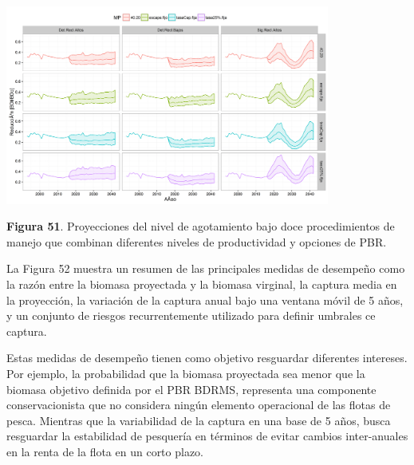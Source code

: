 \documentclass[
  spanish,
]{article}
\begin{document}
\begin{center}
\includegraphics[width=0.8\textwidth]{Figuras/Figura_51.png}
\end{center}

\small \textbf{Figura 51}. Proyecciones del nivel de agotamiento bajo
doce procedimientos de manejo que combinan diferentes niveles de
productividad y opciones de PBR. \vspace{0.5cm} \normalsize

La Figura 52 muestra un resumen de las principales medidas de desempeño
como la razón entre la biomasa proyectada y la biomasa virginal, la
captura media en la proyección, la variación de la captura anual bajo
una ventana móvil de 5 años, y un conjunto de riesgos recurrentemente
utilizado para definir umbrales ce captura.

Estas medidas de desempeño tienen como objetivo resguardar diferentes
intereses. Por ejemplo, la probabilidad que la biomasa proyectada sea
menor que la biomasa objetivo definida por el PBR BDRMS, representa una
componente conservacionista que no considera ningún elemento operacional
de las flotas de pesca. Mientras que la variabilidad de la captura en
una base de 5 años, busca resguardar la estabilidad de pesquería en
términos de evitar cambios inter-anuales en la renta de la flota en un
corto plazo.
\end{document}
